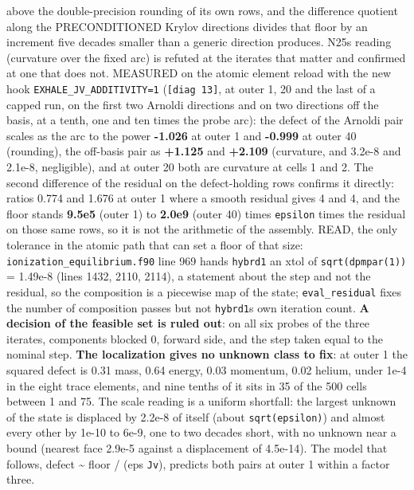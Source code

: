 \documentclass[english,a4paper]{my_memo}
\begin{document}
\begin{itemize}
{  above the double-precision rounding of its own rows, and the difference
  quotient along the PRECONDITIONED Krylov directions divides that floor by
  an increment five decades smaller than a generic direction produces.}
  N25\textquotesingle s reading (curvature over the fixed arc) is refuted at the iterates
  that matter and confirmed at one that does not. MEASURED on the atomic
  element reload with the new hook \texttt{EXHALE\_JV\_ADDITIVITY=1}
  (\texttt{{[}diag\ 13{]}}, at outer 1, 20 and the last of a capped run, on the first
  two Arnoldi directions and on two directions off the basis, at a tenth,
  one and ten times the probe arc): the defect of the Arnoldi pair scales
  as the arc to the power \textbf{-1.026} at outer 1 and \textbf{-0.999} at outer 40
  (rounding), the off-basis pair as \textbf{+1.125} and \textbf{+2.109} (curvature,
  and 3.2e-8 and 2.1e-8, negligible), and at outer 20 both are curvature at
  cells 1 and 2. The second difference of the residual on the
  defect-holding rows confirms it directly: ratios 0.774 and 1.676 at outer
  1 where a smooth residual gives 4 and 4, and the floor stands \textbf{9.5e5}
  (outer 1) to \textbf{2.0e9} (outer 40) times \texttt{epsilon} times the residual on
  those same rows, so it is not the arithmetic of the assembly. READ, the
  only tolerance in the atomic path that can set a floor of that size:
  \texttt{ionization\_equilibrium.f90} line 969 hands \texttt{hybrd1} an xtol of
  \texttt{sqrt(dpmpar(1))} = 1.49e-8 (lines 1432, 2110, 2114), a statement about
  the step and not the residual, so the composition is a piecewise map of
  the state; \texttt{eval\_residual} fixes the number of composition passes but not
  \texttt{hybrd1}\textquotesingle s own iteration count. \textbf{A decision of the feasible set is ruled
  out}: on all six probes of the three iterates, components blocked 0,
  forward side, and the step taken equal to the nominal step. \textbf{The
  localization gives no unknown class to fix}: at outer 1 the squared
  defect is 0.31 mass, 0.64 energy, 0.03 momentum, 0.02 helium, under 1e-4
  in the eight trace elements, and nine tenths of it sits in 35 of the 500
  cells between 1 and 75. The scale reading is a uniform shortfall: the
  largest unknown of the state is displaced by 2.2e-8 of itself (about
  \texttt{sqrt(epsilon)}) and almost every other by 1e-10 to 6e-9, one to two
  decades short, with no unknown near a bound (nearest face 2.9e-5 against
  a displacement of 4.5e-14). The model that follows, defect \textasciitilde{} floor /
  (eps \texttt{\textbar{}\textbar{}Jv\textbar{}\textbar{}}), predicts both pairs at outer 1 within a factor three.

\end{itemize}
\end{document}
